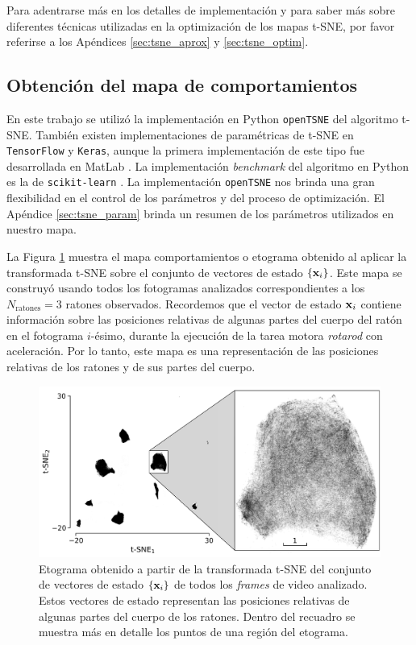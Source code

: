 Para adentrarse más en los detalles de implementación y para saber más sobre diferentes técnicas utilizadas en la optimización de los mapas t-SNE, por favor referirse a los Apéndices \ref{sec:tsne_aprox} y \ref{sec:tsne_optim}.

\subsection{Obtención del mapa de comportamientos}\label{subsec:tsne_aprox}

En este trabajo se utilizó la implementación en Python \texttt{openTSNE} \cite{policar_tsne} del algoritmo t-SNE. También existen implementaciones de paramétricas de t-SNE en \texttt{TensorFlow} y \texttt{Keras}, aunque la primera implementación de este tipo fue desarrollada en MatLab \cite{vdm_tsne}. La implementación \textit{benchmark} del algoritmo en Python es la de \texttt{scikit-learn} \cite{scikit-learn}. La implementación \texttt{openTSNE} nos brinda una gran flexibilidad en el control de los parámetros y del proceso de optimización. El Apéndice \ref{sec:tsne_param} brinda un resumen de los parámetros utilizados en nuestro mapa.

La Figura \ref{fig:tsne_black} muestra el mapa comportamientos o etograma obtenido al aplicar la transformada t-SNE sobre el conjunto de vectores de estado $\{\vb{x}_i\}$. Este mapa se construyó usando todos los fotogramas analizados correspondientes a los $N_{\mathrm{ratones}} = 3$ ratones observados. Recordemos que el vector de estado $\vb{x}_i$ contiene información sobre las posiciones relativas de algunas partes del cuerpo del ratón en el fotograma $i$-ésimo, durante la ejecución de la tarea motora \textit{rotarod} con aceleración. Por lo tanto, este mapa es una representación de las posiciones relativas de los ratones y de sus partes del cuerpo.

\begin{figure}[!htbp]
    \centering
    \includegraphics[width=\linewidth]{figuras/expertos/tsne/tsne_black.pdf}
    \caption{ Etograma obtenido a partir de la transformada t-SNE del conjunto de vectores de estado $\{\vb{x}_i\}$ de todos los \textit{frames} de video analizado. Estos vectores de estado representan las posiciones relativas de algunas partes del cuerpo de los ratones. Dentro del recuadro se muestra más en detalle los puntos de una región del etograma. }
    \label{fig:tsne_black}
\end{figure}

